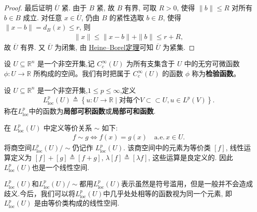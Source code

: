 \documentclass[../../main.tex]{subfiles}
\begin{document}
\begin{proof}
最后证明 $\overline{U}$ 紧. 由于 $B$ 紧, 故 $B$ 有界, 可取 $R>0$, 使得 $\|b\|\leqslant R$ 对所有 $b\in B$ 成立. 对任意 $x\in\overline{U}$, 仍由 $B$ 的紧性选取 $b\in B$, 使得 $\|x-b\|=d_B(x)\leqslant r$, 则
\begin{align*}
\|x\|\leqslant\|x-b\|+\|b\|\leqslant r+R,
\end{align*}
故 $\overline{U}$ 有界. 又 $\overline{U}$ 为闭集, 由 \hyperref[Real Analysis-theorem:Heine - Borel有限子覆盖定理]{Heine--Borel定理}可知 $\overline{U}$ 为紧集.
\end{proof}

\begin{definition}
设 $U \subseteq \mathbb{R}^n$ 是一个非空开集,记 $C^{\infty}_{c}(U)$ 为所有支集含于 $U$ 中的无穷可微函数 $\phi:U\to\mathbb{R}$ 所构成的空间。我们有时把属于 $C^{\infty}_{c}(U)$ 的函数 $\phi$ 称为\textbf{检验函数}。
\end{definition}

\begin{definition}\label{definition:local_integrable_2026}
设 $U \subseteq \mathbb{R}^n$ 是一个非空开集,$1\leqslant p\leqslant \infty$,定义
\begin{align*}
L_{\mathrm{loc}}^{p}\left( U \right) \triangleq \left\{ u:U\rightarrow \mathbb{R} \mid \text{对每个}V\subset \subset U,u\in L^p\left( V \right) \right\} .
\end{align*}
称在$L_{\mathrm{loc}}^{p}$中的函数为\textbf{局部可积函数}或\textbf{局部可和函数}.

在 $L_{\mathrm{loc}}^p(U)$ 中定义等价关系 $\sim$ 如下:
\begin{align*}
f \sim g\iff f(x)=g(x)\quad \text{a.e.}\,x \in U.
\end{align*}
将商空间$L_{\mathrm{loc}}^p(U)/\sim$仍记作 $L_{\mathrm{loc}}^p(U)$. 该商空间中的元素为等价类 $[f]$, 线性运算定义为 $[f]+[g] \triangleq [f+g]$, $\lambda [f] \triangleq [\lambda f]$, 这些运算是良定义的. 因此 $L_{\mathrm{loc}}^p(U)$也是一个线性空间.
\end{definition}
\begin{remark}
$L_{\mathrm{loc}}^p(U)$和$L_{\mathrm{loc}}^p(U)/\sim$都用$L_{\mathrm{loc}}^p(U)$表示虽然是符号滥用，但是一般并不会造成歧义.今后，我们可以将$L_{\mathrm{loc}}^p(U)$中几乎处处相等的函数视为同一个元素, 即 $L_{\mathrm{loc}}^p(U)$ 是由等价类构成的线性空间.
\end{remark}
\end{document}
